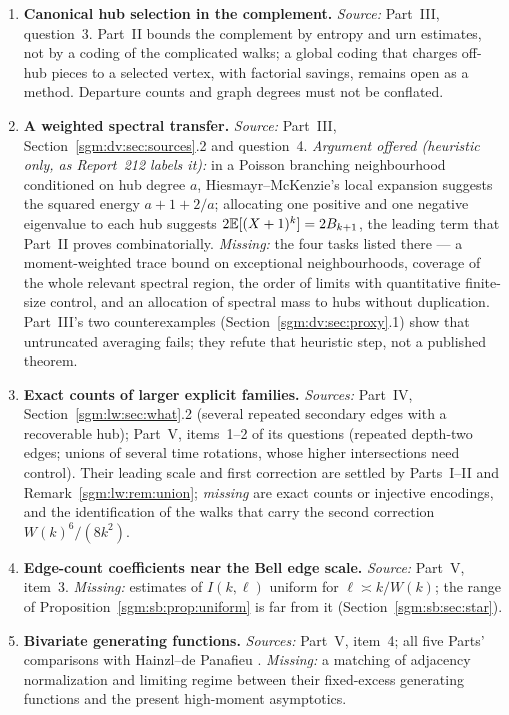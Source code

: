 \documentclass[11pt,letterpaper]{article}
\theoremstyle{remark}\newtheorem{remark}[theorem]{Remark}
\theoremstyle{definition}\newtheorem{definition}[theorem]{Definition}
\begin{document}
\begin{enumerate}
\item\label{sgm:q:hubs} \textbf{Canonical hub selection in the complement.} \emph{Source:} Part~III, question~3. Part~II bounds the complement by entropy and urn estimates, not by a coding of the complicated walks; a global coding that charges off-hub pieces to a selected vertex, with factorial savings, remains open as a method. Departure counts and graph degrees must not be conflated.
\item\label{sgm:q:spectral} \textbf{A weighted spectral transfer.} \emph{Source:} Part~III, Section~\ref{sgm:dv:sec:sources}.2 and question~4. \emph{Argument offered (heuristic only, as Report~212 labels it):} in a Poisson branching neighbourhood conditioned on hub degree $a$, Hiesmayr--McKenzie's local expansion suggests the squared energy $a+1+2/a$; allocating one positive and one negative eigenvalue to each hub suggests $2\mathbb E[(X+1)^k]=2B_{k+1}$, the leading term that Part~II proves combinatorially. \emph{Missing:} the four tasks listed there --- a moment-weighted trace bound on exceptional neighbourhoods, coverage of the whole relevant spectral region, the order of limits with quantitative finite-size control, and an allocation of spectral mass to hubs without duplication. Part~III's two counterexamples (Section~\ref{sgm:dv:sec:proxy}.1) show that untruncated averaging fails; they refute that heuristic step, not a published theorem.
\item\label{sgm:q:families} \textbf{Exact counts of larger explicit families.} \emph{Sources:} Part~IV, Section~\ref{sgm:lw:sec:what}.2 (several repeated secondary edges with a recoverable hub); Part~V, items~1--2 of its questions (repeated depth-two edges; unions of several time rotations, whose higher intersections need control). Their leading scale and first correction are settled by Parts~I--II and Remark~\ref{sgm:lw:rem:union}; \emph{missing} are exact counts or injective encodings, and the identification of the walks that carry the second correction $W(k)^6/(8k^2)$.
\item\label{sgm:q:coefficients} \textbf{Edge-count coefficients near the Bell edge scale.} \emph{Source:} Part~V, item~3. \emph{Missing:} estimates of $I(k,\ell)$ uniform for $\ell\asymp k/W(k)$; the range of Proposition~\ref{sgm:sb:prop:uniform} is far from it (Section~\ref{sgm:sb:sec:star}).
\item\label{sgm:q:bivariate} \textbf{Bivariate generating functions.} \emph{Sources:} Part~V, item~4; all five Parts' comparisons with Hainzl--de Panafieu \cite{hdp}. \emph{Missing:} a matching of adjacency normalization and limiting regime between their fixed-excess generating functions and the present high-moment asymptotics.

\end{enumerate}
\end{document}
